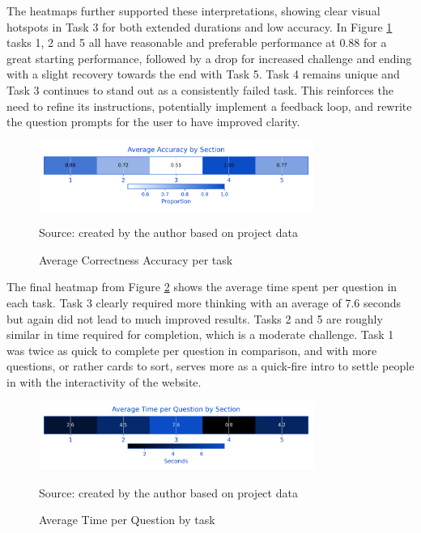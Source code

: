 The heatmaps further supported these interpretations, showing clear visual hotspots in Task 3 for both extended durations and low accuracy. 
In Figure \ref{fig:acc_hm} tasks 1, 2 and 5 all have reasonable and preferable performance at 0.88 for a great starting performance, followed by a drop for increased challenge and ending with a slight recovery towards the end with Task 5.
Task 4 remains unique and Task 3 continues to stand out as a consistently failed task. 
This reinforces the need to refine its instructions, potentially implement a feedback loop, and rewrite the question prompts for the user to have improved clarity.

\begin{figure}[hbtp]
\centering
\includegraphics[width=0.8\textwidth]{figures/heatmap_accuracy.png}
\caption{Average Correctness Accuracy per task}
\label{fig:acc_hm}
{\raggedright \small{Source: created by the author based on project data}\par}
\end{figure}

The final heatmap from Figure \ref{fig:q_hm} shows the average time spent per question in each task. 
Task 3 clearly required more thinking with an average of 7.6 seconds but again did not lead to much improved results. 
Tasks 2 and 5 are roughly similar in time required for completion, which is a moderate challenge. 
Task 1 was twice as quick to complete per question in comparison, and with more questions, or rather cards to sort, serves more as a quick-fire intro to settle people in with the interactivity of the website.

\begin{figure}[hbtp]
\centering
\includegraphics[width=0.8\textwidth]{figures/heatmap_time_per_q.png}
\caption{Average Time per Question by task}
\label{fig:q_hm}
{\raggedright \small{Source: created by the author based on project data}\par}
\end{figure}

